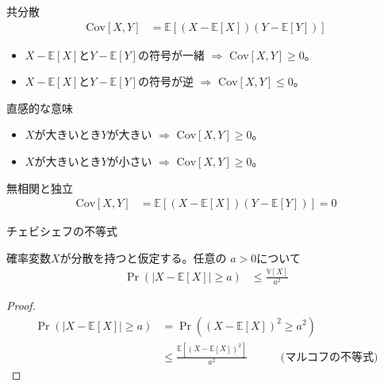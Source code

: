 \documentclass[lualatex,handout]{beamer}
\newcommand{\expt}[1]{\mathbb{E}\left[#1\right]}
\newcommand{\var}[1]{\mathbb{V}\left[#1\right]}
\newcommand{\cov}[1]{\mathrm{Cov}\left[#1\right]}
\theoremstyle{definition}
\begin{document}
\begin{frame}{共分散}
\begin{align*}
\cov{X,Y} &= \expt{(X-\expt{X})(Y-\expt{Y})}
\end{align*}

\vspace{1em}

\begin{itemize}
\setlength{\itemsep}{2em}
\item $X-\expt{X}$と$Y-\expt{Y}$の符号が一緒 $\Rightarrow$ $\cov{X,Y}\ge 0$。
\item $X-\expt{X}$と$Y-\expt{Y}$の符号が逆 $\Rightarrow$ $\cov{X,Y}\le 0$。
\end{itemize}

\vspace{1em}
直感的な意味

\vspace{1em}
\begin{itemize}
\setlength{\itemsep}{2em}
\item $X$が大きいとき$Y$が大きい $\Rightarrow$ $\cov{X,Y}\ge 0$。
\item $X$が大きいとき$Y$が小さい $\Rightarrow$ $\cov{X,Y}\ge 0$。
\end{itemize}
\end{frame}

\begin{frame}{無相関と独立}
\begin{align*}
\cov{X,Y} &= \expt{(X-\expt{X})(Y-\expt{Y})} = 0
\end{align*}
\end{frame}

\begin{frame}{チェビシェフの不等式}
\begin{lemma}[チェビシェフの不等式]
確率変数$X$が分散を持つと仮定する。任意の $a>0$について
\begin{align*}
\Pr(|X-\expt{X}|\ge a) &\le \frac{\var{X}}{a^2}
\end{align*}
\end{lemma}
\begin{proof}
\begin{align*}
\Pr(|X-\expt{X}|\ge a) &=\Pr((X-\expt{X})^2\ge a^2)\\
&\le\frac{\expt{(X-\expt{X})^2}}{a^2}\hspace{3em}\text{(マルコフの不等式)}
\end{align*}
\end{proof}
\end{frame}
\end{document}
